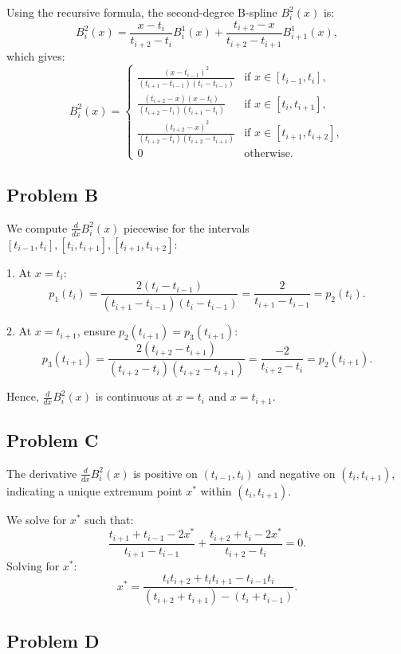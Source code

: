 \documentclass{article}
\begin{document}
Using the recursive formula, the second-degree B-spline \( B_i^2(x) \) is:
\[
B_i^2(x) = \frac{x - t_i}{t_{i+2} - t_i} B_i^1(x) + \frac{t_{i+2} - x}{t_{i+2} - t_{i+1}} B_{i+1}^1(x),
\]
which gives:
\[
B_i^2(x) = \begin{cases} 
\frac{(x - t_{i-1})^2}{(t_{i+1} - t_{i-1})(t_i - t_{i-1})} & \text{if } x \in [t_{i-1}, t_i], \\[10pt]
\frac{(t_{i+2} - x)(x - t_i)}{(t_{i+2} - t_i)(t_{i+1} - t_i)} & \text{if } x \in [t_i, t_{i+1}], \\[10pt]
\frac{(t_{i+2} - x)^2}{(t_{i+2} - t_i)(t_{i+2} - t_{i+1})} & \text{if } x \in [t_{i+1}, t_{i+2}], \\[10pt]
0 & \text{otherwise}.
\end{cases}
\]

\subsection{Problem B}

We compute \( \frac{d}{dx} B_i^2(x) \) piecewise for the intervals \( [t_{i-1}, t_i], [t_i, t_{i+1}], [t_{i+1}, t_{i+2}] \):

1. At \( x = t_i \):
   \[
   p_1(t_i) = \frac{2(t_i - t_{i-1})}{(t_{i+1} - t_{i-1})(t_i - t_{i-1})} = \frac{2}{t_{i+1} - t_{i-1}} = p_2(t_i).
   \]

2. At \( x = t_{i+1} \), ensure \( p_2(t_{i+1}) = p_3(t_{i+1}) \):
   \[
   p_3(t_{i+1}) = \frac{2(t_{i+2} - t_{i+1})}{(t_{i+2} - t_i)(t_{i+2} - t_{i+1})} = \frac{-2}{t_{i+2} - t_i} = p_2(t_{i+1}).
   \]

Hence, \( \frac{d}{dx} B_i^2(x) \) is continuous at \( x = t_i \) and \( x = t_{i+1} \).

\subsection{Problem C}

The derivative \( \frac{d}{dx} B_i^2(x) \) is positive on \( (t_{i-1}, t_i) \) and negative on \( (t_i, t_{i+1}) \), indicating a unique extremum point \( x^* \) within \( (t_i, t_{i+1}) \).

We solve for \( x^* \) such that:
\[
\frac{t_{i+1} + t_{i-1} - 2x^*}{t_{i+1} - t_{i-1}} + \frac{t_{i+2} + t_i - 2x^*}{t_{i+2} - t_i} = 0.
\]
Solving for \( x^* \):
\[
x^* = \frac{t_i t_{i+2} + t_i t_{i+1} - t_{i-1} t_i}{(t_{i+2} + t_{i+1}) - (t_i + t_{i-1})}.
\]

\subsection{Problem D}
\end{document}
